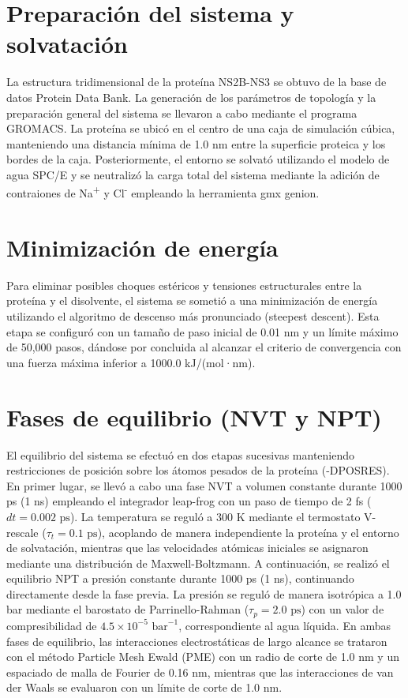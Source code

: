 \section{Preparación del sistema y solvatación}

La estructura tridimensional de la proteína NS2B-NS3 se obtuvo de la base de datos Protein Data Bank. La generación de los parámetros de topología y la preparación general del sistema se llevaron a cabo mediante el programa GROMACS. La proteína se ubicó en el centro de una caja de simulación cúbica, manteniendo una distancia mínima de 1.0 nm entre la superficie proteica y los bordes de la caja. Posteriormente, el entorno se solvató utilizando el modelo de agua SPC/E y se neutralizó la carga total del sistema mediante la adición de contraiones de Na\textsuperscript{+} y Cl\textsuperscript{-} empleando la herramienta gmx genion.

\section{Minimización de energía}

Para eliminar posibles choques estéricos y tensiones estructurales entre la proteína y el disolvente, el sistema se sometió a una minimización de energía utilizando el algoritmo de descenso más pronunciado (steepest descent). Esta etapa se configuró con un tamaño de paso inicial de 0.01 nm y un límite máximo de 50,000 pasos, dándose por concluida al alcanzar el criterio de convergencia con una fuerza máxima inferior a 1000.0 kJ/(mol·nm).

\section{Fases de equilibrio (NVT y NPT)}

El equilibrio del sistema se efectuó en dos etapas sucesivas manteniendo restricciones de posición sobre los átomos pesados de la proteína (-DPOSRES). En primer lugar, se llevó a cabo una fase NVT a volumen constante durante 1000 ps (1 ns) empleando el integrador leap-frog con un paso de tiempo de 2 fs ($dt = 0.002\text{ ps}$). La temperatura se reguló a 300 K mediante el termostato V-rescale ($\tau_t = 0.1\text{ ps}$), acoplando de manera independiente la proteína y el entorno de solvatación, mientras que las velocidades atómicas iniciales se asignaron mediante una distribución de Maxwell-Boltzmann.
A continuación, se realizó el equilibrio NPT a presión constante durante 1000 ps (1 ns), continuando directamente desde la fase previa. La presión se reguló de manera isotrópica a 1.0 bar mediante el barostato de Parrinello-Rahman ($\tau_p = 2.0\text{ ps}$) con un valor de compresibilidad de $4.5 \times 10^{-5}\text{ bar}^{-1}$, correspondiente al agua líquida. En ambas fases de equilibrio, las interacciones electrostáticas de largo alcance se trataron con el método Particle Mesh Ewald (PME) con un radio de corte de 1.0 nm y un espaciado de malla de Fourier de 0.16 nm, mientras que las interacciones de van der Waals se evaluaron con un límite de corte de 1.0 nm.

